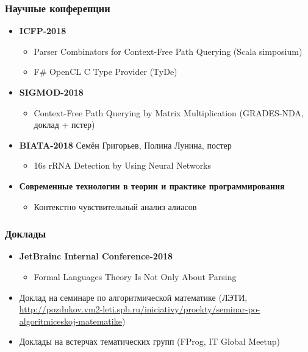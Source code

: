 \documentclass[xcolor=table]{beamer}
\begin{document}
\begin{frame}[fragile]
  \transwipe[direction=90]
  \frametitle{Научные конференции}
\begin{itemize}

      \item \textbf{ICFP-2018}
      \begin{itemize}
        \item Parser Combinators for Context-Free Path Querying (Scala simposium)
        \item F\# OpenCL C Type Provider (TyDe)
      \end{itemize}

      \item \textbf{SIGMOD-2018}
      \begin{itemize}
        \item Context-Free Path Querying by Matrix Multiplication (GRADES-NDA, доклад + пстер)
      \end{itemize}

      \item \textbf{BIATA-2018} Семён Григорьев, Полина Лунина, постер
      \begin{itemize}
         \item 16s rRNA Detection by Using Neural Networks
      \end{itemize}
      
      \item \textbf{Современные технологии в теории и практике программирования}
      \begin{itemize}
         \item Контекстно чувствительный анализ алиасов
      \end{itemize}

\end{itemize}
\end{frame}
 
\begin{frame}[fragile]
  \transwipe[direction=90]
  \frametitle{Доклады}
\begin{itemize}

      \item \textbf{JetBrainc Internal Conference-2018}
      \begin{itemize}
        \item Formal Languages Theory Is Not Only About Parsing
      \end{itemize}

      \item Доклад на семинаре по алгоритмической математике (ЛЭТИ, \url{http://pozdnkov.vm2-leti.spb.ru/iniciativy/proekty/seminar-po-algoritmiceskoj-matematike})

      \item Доклады на встерчах тематических групп (FProg, IT Global Meetup)

\end{itemize}
\end{frame}
\end{document}
